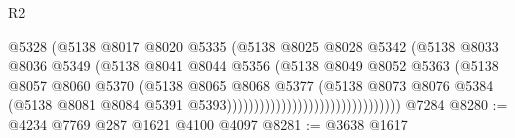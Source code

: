 \begin{lexlean}{R2}
\begin{coremodule}
                                                  @5328
                                                  (@5138
                                                    @8017
                                                    @8020
                                                    @5335
                                                    (@5138
                                                      @8025
                                                      @8028
                                                      @5342
                                                      (@5138
                                                        @8033
                                                        @8036
                                                        @5349
                                                        (@5138
                                                          @8041
                                                          @8044
                                                          @5356
                                                          (@5138
                                                            @8049
                                                            @8052
                                                            @5363
                                                            (@5138
                                                              @8057
                                                              @8060
                                                              @5370
                                                              (@5138
                                                                @8065
                                                                @8068
                                                                @5377
                                                                (@5138
                                                                  @8073
                                                                  @8076
                                                                  @5384
                                                                  (@5138
                                                                    @8081
                                                                    @8084
                                                                    @5391
                                                                    @5393))))))))))))))))))))))))))))))))
    @7284
@8280 := @4234 @7769 @287 @1621 @4100 @4097
@8281 := @3638 @1617

\end{coremodule}
\end{lexlean}
